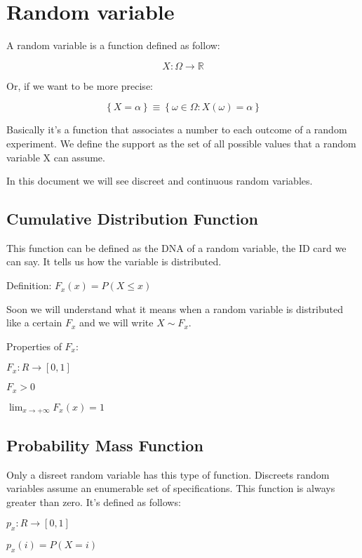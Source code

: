 \documentclass{article}
\begin{document}
\section{Random variable}

A random variable is a function defined as follow:

$$X : \Omega \rightarrow \mathbb{R}$$

Or, if we want to be more precise:

$$\left\{X = \alpha\right\} \equiv \left\{\omega \in \Omega : X(\omega) = \alpha\right\}$$

Basically it's a function that associates a number to each outcome of a random experiment. We define the support as the set of all possible values that a random variable X can assume. 

In this document we will see discreet and continuous random variables.
\bigskip

\subsection{Cumulative Distribution Function}

This function can be defined as the DNA of a random variable, the ID card we can say. It tells us how the variable is distributed.

\bigskip

Definition: $F_x(x) = P(X \leq x)$

Soon we will understand what it means when a random variable is distributed like a certain $F_x$ and we will write $X \sim F_x$. 
\bigskip

Properties of $F_x$:

$F_x : R \rightarrow [0,1]$

$F_x > 0$

$\lim_{x \rightarrow + \infty}F_x(x) = 1$

\subsection{Probability Mass Function}

Only a disreet random variable has this type of function. Discreets random variables assume an enumerable set of specifications. This function is always greater than zero. It's defined as follows:

\bigskip

$p_x : R \rightarrow [0,1]$

$p_x(i) = P(X = i)$
\end{document}

